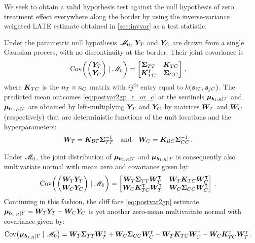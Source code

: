 \begin{appendices}
We seek to obtain a valid hypothesis test against the null hypothesis of zero treatment effect everywhere along the border by using the inverse-variance weighted LATE estimate obtained in \autoref{sec:invvar} as a test statistic.

Under the parametric null hypothesis \(\mathscr{M}_0\), \(\bm{Y}_{T}\) and \(\bm{Y}_{C}\) are drawn from a single Gaussian process, with no discontinuity at the border.
Their joint covariance is
\begin{equation}
\cov \del{\begin{pmatrix}\yt \\ \yc\end{pmatrix} \mid \modnull } 
    = \begin{bmatrix}
        \STT & \KTC \\
        \KTC \trans & \SCC
    \end{bmatrix}\,,
\end{equation}
where \(\bm{K}_{T C}\) is the \(n_T \times n_C\) matrix with \(ij^{\mathrm{th}}\) entry equal to \(k\del{\svec_{i\treat},\svec_{j\ctrol}}\).
The predicted mean outcomes \autoref{eq:postvar2gp_t_or_c} at the sentinels \(\bm{\mu}_{\bm{b}_{1:R} \mid T}\) and \(\bm{\mu}_{\bm{b}_{1:R} \mid T}\) are obtained by left-multiplying \(\bm{Y}_{T}\) and \(\bm{Y}_{C}\) by matrices \(\bm{W}_{T}\) and \(\bm{W}_{C}\) (respectively) that are deterministic functions of the unit locations and the hyperparameters:
\begin{equation}
    \bm{W}_{T} = \bm{K}_{\mathcal{B} T} \bm{\Sigma}_{T T}^{-1} \quad\text{and}\quad
    \bm{W}_{C} = \bm{K}_{\mathcal{B} C} \bm{\Sigma}_{C C}^{-1}\,.
\end{equation}

Under \(\mathscr{M}_0\), the joint distribution of \(\bm{\mu}_{\bm{b}_{1:R} \mid T}\) and \(\bm{\mu}_{\bm{b}_{1:R} \mid T}\) is consequently also multivariate normal with mean zero and covariance given by:
\begin{equation}
\cov \del{\begin{pmatrix}\WT \yt \\ \WC \yc \end{pmatrix} \mid \modnull } = \begin{bmatrix}
    \WT \STT       \WT\trans & \WT \KTC \WC\trans \\
    \WC \KTC\trans \WT\trans & \WC \SCC \WC\trans
\end{bmatrix}\,.
\end{equation}
Continuing in this fashion, the cliff face \autoref{eq:postvar2gp} estimate 
\(\bm{\mu}_{\bm{b}_{1:R} \mid Y} = \bm{W}_{T} \bm{Y}_{T} - \bm{W}_{C} \bm{Y}_{C}\)
is yet another zero-mean multivariate normal with covariance given by:
\begin{equation}
        \cov \del{\muvec_{\sentinels \mid Y} \mid \modnull} 
        = \WT \STT \WT\trans + \WC \SCC \WC\trans - \WT \KTC \WC\trans -  \WC\KTC\trans\WT\trans \,.
\end{equation}


\end{appendices}
